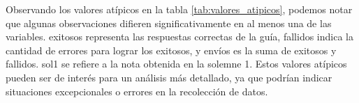 Observando los valores atípicos en la tabla \ref{tab:valores_atipicos}, podemos notar que algunas observaciones difieren significativamente en al menos una de las variables. exitosos representa las respuestas correctas de la guía, fallidos indica la cantidad de errores para lograr los exitosos, y envíos es la suma de exitosos y fallidos. sol1 se refiere a la nota obtenida en la solemne 1. Estos valores atípicos pueden ser de interés para un análisis más detallado, ya que podrían indicar situaciones excepcionales o errores en la recolección de datos.